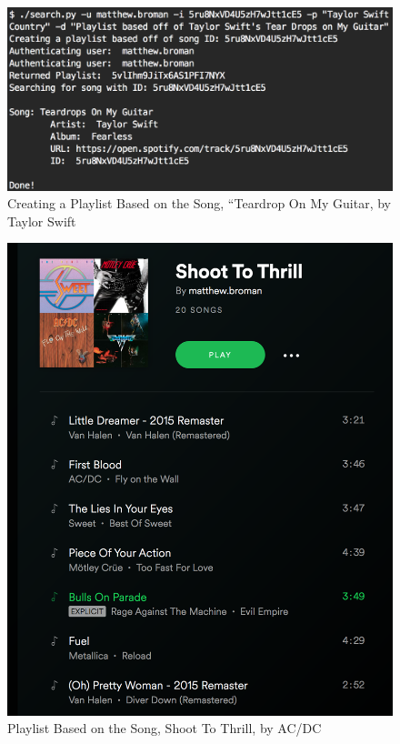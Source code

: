 \documentclass [letter,12pt] {article}
\begin{document}
        \begin{figure}[htp]
            \centering
            \includegraphics[width=\textwidth]{Playlist_Create.png}
            \caption{Creating a Playlist Based on the Song, ``Teardrop On My Guitar, by Taylor Swift}
            \label{fig:playlistcreate}
        \end{figure}
        
        \begin{figure}[htp]
            \centering
            \includegraphics[width=\textwidth]{Created_Playlist.png}
            \caption{Playlist Based on the Song, Shoot To Thrill, by AC/DC}
            \label{fig:playlistshoottothrill}
        \end{figure}
        
\end{document}
